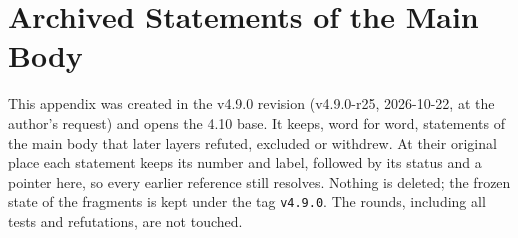 \clearpage
\section*{Archived Statements of the Main Body}
\label{sec:v490-archive}

This appendix was created in the v4.9.0 revision (v4.9.0-r25, 2026-10-22, at the author's request) and opens the
4.10 base.  It keeps, word for word, statements of the main body that later layers refuted, excluded or withdrew.  At
their original place each statement keeps its number and label, followed by its status and a pointer here, so every
earlier reference still resolves.  Nothing is deleted; the frozen state of the fragments is kept under the tag
\texttt{v4.9.0}.  The rounds, including all tests and refutations, are not touched.

